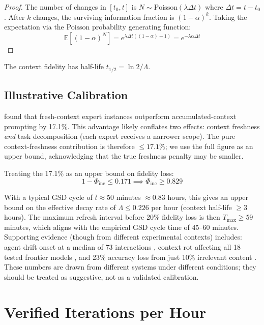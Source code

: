 \documentclass[11pt, a4paper, copyright]{googledeepmind}
\newcommand{\E}{\mathbb{E}}
\begin{document}
\begin{proof}
The number of changes in $[t_0, t]$ is $N \sim \mathrm{Poisson}(\lambda\Delta t)$ where $\Delta t = t - t_0$. After $k$ changes, the surviving information fraction is $(1-\alpha)^k$. Taking the expectation via the Poisson probability generating function:
\[
    \E[(1-\alpha)^N] = e^{\lambda\Delta t((1-\alpha) - 1)} = e^{-\lambda\alpha\Delta t}
\]
\end{proof}

The context fidelity has half-life $t_{1/2} = \ln 2 / \Lambda$.

\subsection{Illustrative Calibration}

\citet{suzgun2024metaprompting} found that fresh-context expert instances outperform accumulated-context prompting by 17.1\%. This advantage likely conflates two effects: context freshness \emph{and} task decomposition (each expert receives a narrower scope). The pure context-freshness contribution is therefore $\leq 17.1\%$; we use the full figure as an upper bound, acknowledging that the true freshness penalty may be smaller.

Treating the 17.1\% as an upper bound on fidelity loss:
\[
    1 - \Phi_{\mathrm{inc}} \leq 0.171 \implies \Phi_{\mathrm{inc}} \geq 0.829
\]

With a typical GSD cycle of $\bar{t} \approx 50$ minutes $\approx 0.83$ hours, this gives an upper bound on the effective decay rate of $\Lambda \leq 0.226$ per hour (context half-life $\geq 3$ hours). The maximum refresh interval before 20\% fidelity loss is then $T_{\max} \geq 59$ minutes, which aligns with the empirical GSD cycle time of 45--60 minutes. Supporting evidence (though from different experimental contexts) includes: agent drift onset at a median of 73 interactions \citep{agentdrift2026}, context rot affecting all 18 tested frontier models \citep{chroma2025rot}, and 23\% accuracy loss from just 10\% irrelevant content \citep{chroma2025rot}. These numbers are drawn from different systems under different conditions; they should be treated as suggestive, not as a validated calibration.


\section{Verified Iterations per Hour}\label{sec:vih}
\end{document}
